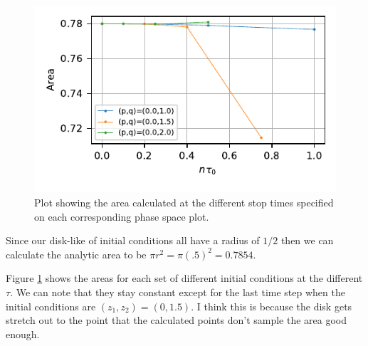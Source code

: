 \begin{figure}
    \centering
    \includegraphics{CodeAndFigures/PendulumPhaseSpaceAreas.pdf}
    \caption{Plot showing the area calculated at the different stop times specified on each corresponding phase space plot.}
    \label{fig:pendAreas}
\end{figure}

Since our disk-like of initial conditions all have a radius of $1/2$ then we can calculate the analytic area to be $\pi r^2 = \pi(.5)^2=0.7854$.

Figure \ref{fig:pendAreas} shows the areas for each set of different initial conditions at the different $\tau$. We can note that they stay constant except for the last time step when the initial conditions are $(z_1,z_2)=(0,1.5)$. I think this is because the disk gets stretch out to the point that the calculated points don't sample the area good enough.
